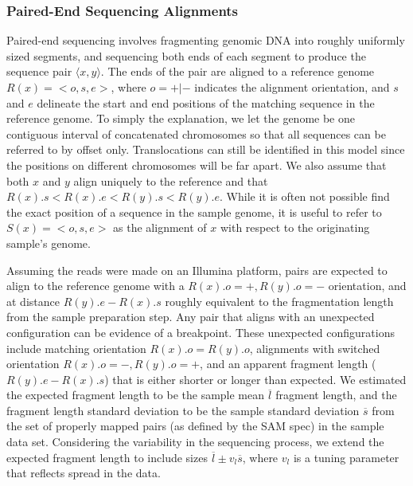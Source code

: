 \documentclass[11pt]{article}
\begin{document}
\subsubsection{Paired-End Sequencing Alignments}

Paired-end sequencing involves fragmenting genomic DNA into roughly uniformly
sized segments, and sequencing both ends of each segment to produce the sequence
pair $\langle x,y \rangle$.  The ends of the pair are
aligned to a reference genome $R(x)=<o,s,e>$, where $o=+|-$ indicates the
alignment orientation, and $s$ and $e$ delineate the start and end positions of
the matching sequence in the reference genome.  To simply the explanation, we
let the genome be one contiguous interval of concatenated chromosomes so that
all sequences can be referred to by offset only.  Translocations can still be
identified in this model since the positions on different chromosomes will be
far apart.  We also assume that both $x$ and $y$ align uniquely to the
reference and that $R(x).s<R(x).e<R(y).s<R(y).e$.  While it is often not
possible find the exact position of a sequence in the sample genome, it is
useful to refer to $S(x)=<o,s,e>$ as the alignment of $x$ with respect to the
originating sample's genome.  

Assuming the reads were made on an Illumina platform, pairs are expected to
align to the reference genome with a $R(x).o=+, R(y).o=-$ orientation, and at
distance $R(y).e - R(x).s$ roughly equivalent to the fragmentation length from
the sample preparation step.  Any pair that aligns with an unexpected
configuration can be evidence of a breakpoint.  These unexpected configurations
include matching orientation $R(x).o = R(y).o$, alignments with switched
orientation $R(x).o=-, R(y).o=+$, and an apparent fragment length ($R(y).e -
R(x).s$) that is either shorter or longer than expected.  We estimated the
expected fragment length to be the sample mean $\overline{l}$ fragment length,
and the fragment length standard deviation to be the sample standard deviation
$\overline{s}$ from the set of properly mapped pairs (as defined by the SAM
spec) in the sample data set.  Considering the variability in the sequencing
process, we extend the expected fragment length to include sizes 
$\overline{l}\pm v_l \overline{s}$, where $v_l$ is a tuning parameter that
reflects spread in the data.
\end{document}
